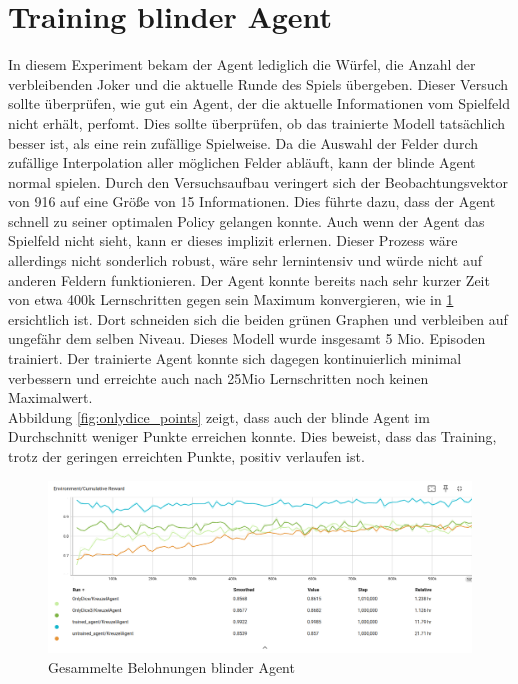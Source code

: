 \section{Training blinder Agent}
In diesem Experiment bekam der Agent lediglich die Würfel, die Anzahl der verbleibenden Joker und die aktuelle Runde des Spiels übergeben.
Dieser Versuch sollte überprüfen, wie gut ein Agent, der die aktuelle Informationen vom  Spielfeld nicht erhält, perfomt. Dies sollte überprüfen, ob das trainierte Modell tatsächlich besser ist, als eine rein zufällige Spielweise.
Da die Auswahl der Felder durch  zufällige Interpolation aller möglichen Felder abläuft, kann der blinde Agent normal spielen. Durch den Versuchsaufbau veringert sich der Beobachtungsvektor von 916 auf eine Größe von 15 Informationen. Dies führte dazu, dass der Agent schnell zu seiner optimalen Policy gelangen konnte. Auch wenn der Agent das Spielfeld nicht sieht, kann er dieses implizit erlernen. Dieser Prozess wäre allerdings nicht sonderlich robust, wäre sehr lernintensiv und würde nicht auf anderen Feldern funktionieren. Der Agent konnte bereits nach sehr kurzer Zeit von etwa 400k Lernschritten gegen sein Maximum konvergieren, wie in \ref{fig:onlydice_rewards} ersichtlich ist. Dort schneiden sich die beiden grünen Graphen und verbleiben auf ungefähr dem selben Niveau. Dieses Modell wurde insgesamt 5 Mio. Episoden trainiert. Der trainierte Agent konnte sich dagegen kontinuierlich minimal verbessern und erreichte auch nach 25Mio Lernschritten noch keinen Maximalwert. \\
Abbildung \ref{fig:onlydice_points} zeigt, dass auch der blinde Agent im Durchschnitt weniger Punkte erreichen konnte. Dies beweist, dass das Training, trotz der geringen erreichten Punkte, positiv verlaufen ist.


\begin{figure}[!h]
    \centering
    \includegraphics[scale=0.3]{Bilder/rewards_onlydice.png}
    \caption{Gesammelte Belohnungen blinder Agent}
    \label{fig:onlydice_rewards}
\end{figure}

